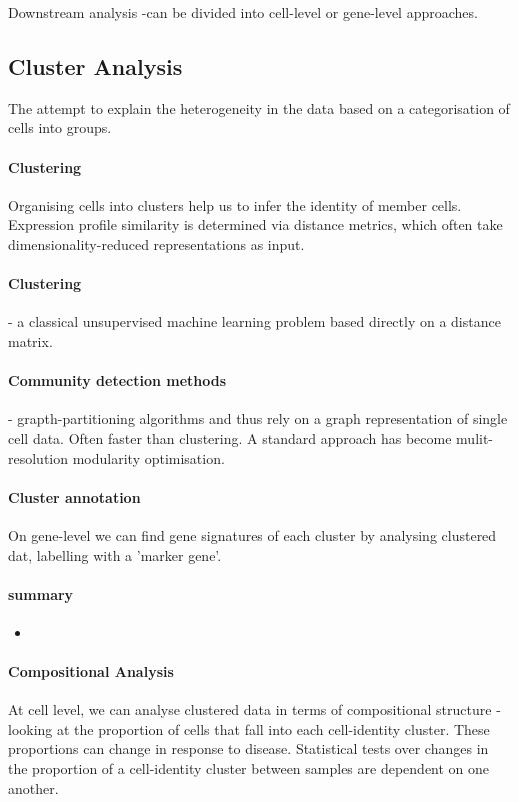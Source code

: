 \documentclass[a4paper,12pt]{article}
\begin{document}
Downstream analysis -can be divided into cell-level or gene-level approaches. 
\subsection{Cluster Analysis}
The attempt to explain the heterogeneity in the data based on a categorisation of cells into groups.
\paragraph{Clustering}
Organising cells into clusters help us to infer the identity of member cells.
Expression profile similarity is determined via distance metrics, which often take dimensionality-reduced representations as input.
\paragraph{Clustering} - a classical unsupervised machine learning problem based directly on a distance matrix.
\paragraph{Community detection methods} - grapth-partitioning algorithms and thus rely on a graph representation of single cell data. Often faster than clustering.
A standard approach has become mulit-resolution modularity optimisation. 

\paragraph{Cluster annotation}
On gene-level we can find gene signatures of each cluster by analysing clustered dat, labelling with a 'marker gene'.
\paragraph{summary}
\begin{itemize}
\item
\end{itemize}

\paragraph{Compositional Analysis}
At cell level, we can analyse clustered data in terms of compositional structure - looking at the proportion of cells that fall into each cell-identity cluster. These proportions can change in response to disease.
Statistical tests over changes in the proportion of a cell-identity cluster between samples are dependent on one another.
\end{document}
